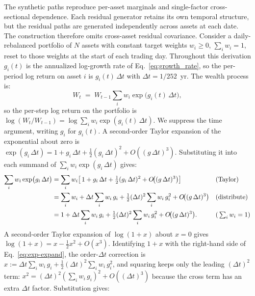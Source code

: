 The synthetic paths reproduce per-asset marginals and single-factor
cross-sectional dependence. Each residual generator retains its own
temporal structure, but the residual paths are generated independently
across assets at each date. The construction therefore omits
cross-asset residual covariance. Consider a
daily-rebalanced portfolio of $N$
assets with constant target weights $w_i \ge 0$, $\sum_i w_i = 1$,
reset to those weights at the start of each trading day. Throughout
this derivation $g_i(t)$ is the annualized log-growth rate of
Eq.~\eqref{eq:growth_rate}, so the per-period log return on asset
$i$ is $g_i(t)\,\Delta t$ with $\Delta t = 1/252$~yr. The wealth
process is:
\begin{equation}
  W_t \;=\; W_{t-1} \sum_{i} w_i \exp\!\big(g_i(t)\,\Delta t\big),
  \label{eq:wealth-recursion}
\end{equation}
so the per-step log return on the portfolio is
$\log(W_t/W_{t-1}) = \log\!\sum_i w_i \exp(g_i(t)\,\Delta t)$. We
suppress the time argument, writing $g_i$ for $g_i(t)$. A
second-order Taylor expansion of the exponential about zero is
$\exp(g_i\,\Delta t) = 1 + g_i\,\Delta t + \tfrac{1}{2}(g_i\,\Delta t)^2
+ O((g\,\Delta t)^3)$. Substituting it into each summand of
$\sum_i w_i \exp(g_i\,\Delta t)$ gives:
\begin{align}
  \sum_{i} w_i \exp\!\big(g_i\,\Delta t\big)
   &= \sum_{i} w_i \!\left[\,1 + g_i\,\Delta t
        + \tfrac{1}{2}(g_i\,\Delta t)^2
        + O\!\big((g\,\Delta t)^3\big)\right]
       && \text{(Taylor)} \notag \\
   &= \sum_{i} w_i
        + \Delta t \sum_{i} w_i\, g_i
        + \tfrac{1}{2}(\Delta t)^2 \sum_{i} w_i\, g_i^2
        + O\!\big((g\,\Delta t)^3\big)
       && \text{(distribute)} \notag \\
   &= 1 + \Delta t \sum_{i} w_i\, g_i
        + \tfrac{1}{2}(\Delta t)^2 \sum_{i} w_i\, g_i^2
        + O\!\big((g\,\Delta t)^3\big).
       && \text{(}\textstyle\sum_i w_i = 1\text{)}
  \label{eq:exp-expand}
\end{align}
A second-order Taylor expansion of $\log(1+x)$ about $x=0$ gives
$\log(1+x) = x - \tfrac{1}{2}x^2 + O(x^3)$. Identifying $1 + x$ with
the right-hand side of Eq.~\eqref{eq:exp-expand}, the order-$\Delta t$
correction is
$x := \Delta t \sum_i w_i\, g_i + \tfrac{1}{2}(\Delta t)^2 \sum_i w_i\, g_i^2$,
and squaring keeps only the leading $(\Delta t)^2$ term:
$x^2 = (\Delta t)^2 (\sum_i w_i\, g_i)^2 + O((\Delta t)^3)$ because
the cross term has an extra $\Delta t$ factor. Substitution gives:
